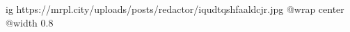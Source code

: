  
 
 
 
 

\ifcmt
  ig https://mrpl.city/uploads/posts/redactor/iqudtqshfaaldcjr.jpg
  @wrap center
  @width 0.8
\fi
